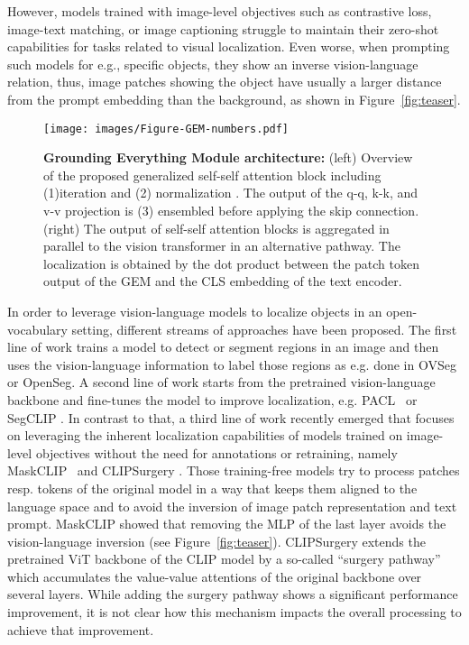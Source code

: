 \documentclass[10pt,twocolumn,letterpaper]{article}
\begin{document}
However, models trained with image-level objectives such as contrastive loss, image-text matching, or image captioning struggle to maintain their zero-shot capabilities for tasks related to visual localization. Even worse, when prompting such models for e.g., specific objects, they show an inverse vision-language relation, thus, image patches showing the object have usually a larger distance from the prompt embedding than the background, as shown in Figure~\ref{fig:teaser}.
\begin{figure*}[t]
\centering \label{fig:main-fig}
     \texttt{[image: images/Figure-GEM-numbers.pdf]}
     \vspace{-1cm}
     \caption{\textbf{Grounding Everything Module architecture:} (left) Overview of the proposed generalized self-self attention block including (1)iteration and (2) normalization . The output of the q-q, k-k, and v-v projection is (3) ensembled before applying the skip connection.  (right) The output of self-self attention blocks is aggregated in parallel to the vision transformer in an alternative pathway. The localization is obtained by the dot product between the patch token output of the GEM and the CLS embedding of the text encoder. }
     \label{fig:overview}
     \vspace{-5mm}
\end{figure*}

In order to leverage vision-language models to localize objects in an open-vocabulary setting, different streams of approaches have been proposed. 
The first line of work trains a model to detect or segment regions in an image and then uses the vision-language information to label those regions as e.g. done in OVSeg\citep{liang2023open} or OpenSeg\citep{ghiasi2022scaling}.
A second line of work starts from the pretrained vision-language backbone and fine-tunes the model to improve localization, e.g. PACL~\citep{mukhoti2023open} or SegCLIP \citep{luo2023segclip}.
In contrast to that, a third line of work recently emerged that focuses on leveraging the inherent localization capabilities of models trained on image-level objectives without the need for annotations or retraining, namely
MaskCLIP~\citep{zhou2022extract} and CLIPSurgery \citep{li2023clipsurgery}.
Those training-free models try to process patches resp. tokens of the original model in a way that keeps them aligned to the language space and to avoid the inversion of image patch representation and text prompt. MaskCLIP showed that removing the MLP of the last layer avoids the vision-language inversion (see Figure~\ref{fig:teaser}). CLIPSurgery extends the pretrained ViT backbone of the CLIP model by a so-called ``surgery pathway'' which accumulates the value-value attentions of the original backbone over several layers. While adding the surgery pathway shows a significant performance improvement, it is not clear how this mechanism impacts the overall processing to achieve that improvement.
\end{document}
